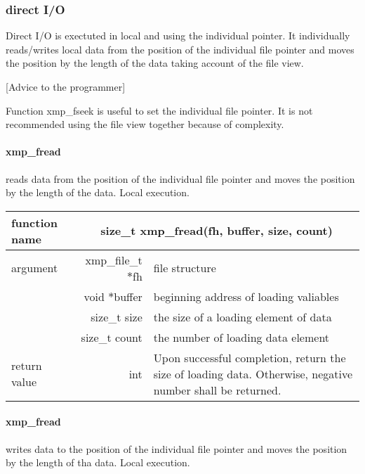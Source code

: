    \subsubsection{direct I/O}

   Direct I/O is exectuted in local and using the individual pointer. 
   It individually reads/writes local data
   from the position of the individual file pointer and 
   moves the position by the length of the data taking account of the file view.

   [Advice to the programmer]

   Function xmp\_fseek is useful to set the individual file pointer.
   It is not recommended using the file view together because of complexity.

   \paragraph{ xmp\_fread} reads data from the position of the individual file
   pointer and moves the position by the length of the data.
   Local execution.

   \begin{table}[h]
    \begin{center}
     \begin{tabular}{|l|r|p{80mm}|}
      \hline
      {\bf function name}  & \multicolumn{2}{c|}{\bf size\_t
      xmp\_fread(fh, buffer, size, count)} \\ \hline \hline
      argument & xmp\_file\_t $*$fh & file structure \\ \cline{2-3}
      & void $*$buffer & beginning address of loading valiables \\ \cline{2-3}
      & size\_t size & the size of a loading element of data \\ \cline{2-3}
      & size\_t count & the number of loading data element \\ \hline
      return value & int & Upon successful completion, return the size
	      of loading data. Otherwise, negative number shall be
	      returned. \\ \hline
      \end{tabular}
     \end{center}
    \label{tb:aaa}
   \end{table}

   \paragraph{ xmp\_fread} writes data to the position of the individual file
   pointer and moves the position by the length of tha data.
   Local execution.

